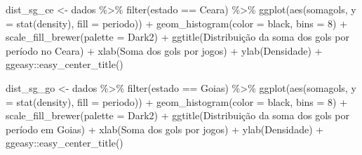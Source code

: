 \documentclass[
]{article}
\newenvironment{Shaded}{\begin{snugshade}}{\end{snugshade}}
\newcommand{\AttributeTok}[1]{\textcolor[rgb]{0.77,0.63,0.00}{#1}}
\newcommand{\DecValTok}[1]{\textcolor[rgb]{0.00,0.00,0.81}{#1}}
\newcommand{\FunctionTok}[1]{\textcolor[rgb]{0.00,0.00,0.00}{#1}}
\newcommand{\NormalTok}[1]{#1}
\newcommand{\OtherTok}[1]{\textcolor[rgb]{0.56,0.35,0.01}{#1}}
\newcommand{\SpecialCharTok}[1]{\textcolor[rgb]{0.00,0.00,0.00}{#1}}
\newcommand{\StringTok}[1]{\textcolor[rgb]{0.31,0.60,0.02}{#1}}
\begin{document}
\begin{Shaded}
\begin{Highlighting}[]
\NormalTok{dist\_sg\_ce }\OtherTok{\textless{}{-}}\NormalTok{ dados }\SpecialCharTok{\%\textgreater{}\%} \FunctionTok{filter}\NormalTok{(estado }\SpecialCharTok{==} \StringTok{\textquotesingle{}Ceara\textquotesingle{}}\NormalTok{) }\SpecialCharTok{\%\textgreater{}\%}
  \FunctionTok{ggplot}\NormalTok{(}\FunctionTok{aes}\NormalTok{(somagols, }\AttributeTok{y =} \FunctionTok{stat}\NormalTok{(density), }\AttributeTok{fill =}\NormalTok{ periodo)) }\SpecialCharTok{+} 
  \FunctionTok{geom\_histogram}\NormalTok{(}\AttributeTok{color =} \StringTok{\textquotesingle{}black\textquotesingle{}}\NormalTok{, }\AttributeTok{bins =} \DecValTok{8}\NormalTok{) }\SpecialCharTok{+} 
  \FunctionTok{scale\_fill\_brewer}\NormalTok{(}\AttributeTok{palette =} \StringTok{\textquotesingle{}Dark2\textquotesingle{}}\NormalTok{) }\SpecialCharTok{+}
  \FunctionTok{ggtitle}\NormalTok{(}\StringTok{\textquotesingle{}Distribuição da soma dos gols por período no Ceara\textquotesingle{}}\NormalTok{) }\SpecialCharTok{+}
  \FunctionTok{xlab}\NormalTok{(}\StringTok{\textquotesingle{}Soma dos gols por jogos\textquotesingle{}}\NormalTok{) }\SpecialCharTok{+} \FunctionTok{ylab}\NormalTok{(}\StringTok{\textquotesingle{}Densidade\textquotesingle{}}\NormalTok{) }\SpecialCharTok{+}
\NormalTok{  ggeasy}\SpecialCharTok{::}\FunctionTok{easy\_center\_title}\NormalTok{()}

\NormalTok{dist\_sg\_go }\OtherTok{\textless{}{-}}\NormalTok{ dados }\SpecialCharTok{\%\textgreater{}\%} \FunctionTok{filter}\NormalTok{(estado }\SpecialCharTok{==} \StringTok{\textquotesingle{}Goias\textquotesingle{}}\NormalTok{) }\SpecialCharTok{\%\textgreater{}\%}
  \FunctionTok{ggplot}\NormalTok{(}\FunctionTok{aes}\NormalTok{(somagols, }\AttributeTok{y =} \FunctionTok{stat}\NormalTok{(density), }\AttributeTok{fill =}\NormalTok{ periodo)) }\SpecialCharTok{+} 
  \FunctionTok{geom\_histogram}\NormalTok{(}\AttributeTok{color =} \StringTok{\textquotesingle{}black\textquotesingle{}}\NormalTok{, }\AttributeTok{bins =} \DecValTok{8}\NormalTok{) }\SpecialCharTok{+} 
  \FunctionTok{scale\_fill\_brewer}\NormalTok{(}\AttributeTok{palette =} \StringTok{\textquotesingle{}Dark2\textquotesingle{}}\NormalTok{) }\SpecialCharTok{+}
  \FunctionTok{ggtitle}\NormalTok{(}\StringTok{\textquotesingle{}Distribuição da soma dos gols por período em Goias\textquotesingle{}}\NormalTok{) }\SpecialCharTok{+}
  \FunctionTok{xlab}\NormalTok{(}\StringTok{\textquotesingle{}Soma dos gols por jogos\textquotesingle{}}\NormalTok{) }\SpecialCharTok{+} \FunctionTok{ylab}\NormalTok{(}\StringTok{\textquotesingle{}Densidade\textquotesingle{}}\NormalTok{) }\SpecialCharTok{+}
\NormalTok{  ggeasy}\SpecialCharTok{::}\FunctionTok{easy\_center\_title}\NormalTok{()}


\end{Highlighting}
\end{Shaded}
\end{document}
